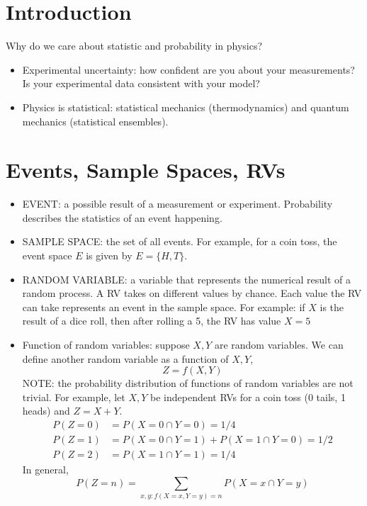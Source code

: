 \documentclass[12pt]{article}
\numberwithin{equation}{section}
\begin{document}
	
\section{Introduction}

Why do we care about statistic and probability in physics?
\begin{itemize}
	\item Experimental uncertainty: how confident are you about your measurements? Is your experimental data consistent with your model? 
	\item Physics is statistical: statistical mechanics (thermodynamics) and quantum mechanics (statistical ensembles).
\end{itemize}

\section{Events, Sample Spaces, RVs}

\begin{itemize}
	\item EVENT: a possible result of a measurement or experiment. Probability describes the statistics of an event happening.
	\item SAMPLE SPACE: the set of all events. For example, for a coin toss, the event space $ E $ is given by $ E = \{H, T\} $.
	\item RANDOM VARIABLE: a variable that represents the numerical result of a random process.  A RV takes on different values by chance. Each value the RV can take represents an event in the sample space. For example: if $ X $ is the result of a dice roll, then after rolling a 5, the RV has value $ X=5 $
	\item Function of random variables: suppose $ X,Y $ are random variables. We can define another random variable as a function of $ X,Y $,
	\begin{equation}
			Z = f(X,Y)
	\end{equation}
NOTE: the probability distribution of functions of random variables are not trivial. For example, let $ X,Y $ be independent RVs for a coin toss (0 tails, 1 heads) and $ Z = X+Y $.
\begin{align}
	P(Z=0) &= P(X=0\cap Y=0) = 1/4\\
	P(Z=1) &= P(X=0\cap Y=1) + P(X=1\cap Y=0) = 1/2\\
	P(Z=2) &= P(X=1\cap Y=1) = 1/4
\end{align}
In general,
\begin{equation}
		P(Z=n) = \sum_{x,y: f(X=x,Y=y)=n}P(X=x\cap Y=y)
\end{equation}
\end{itemize}
\end{document}
